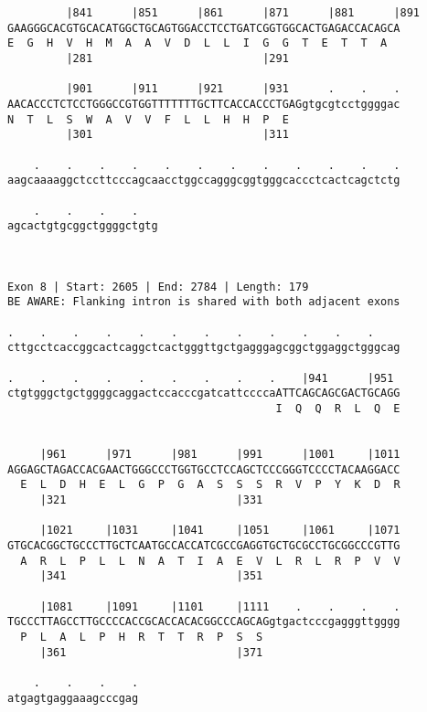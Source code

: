 \documentclass{article}
\begin{document}
\begin{Verbatim}
         |841      |851      |861      |871      |881      |891
GAAGGGCACGTGCACATGGCTGCAGTGGACCTCCTGATCGGTGGCACTGAGACCACAGCA
E  G  H  V  H  M  A  A  V  D  L  L  I  G  G  T  E  T  T  A  
         |281                          |291                 
  
         |901      |911      |921      |931      .    .    .
AACACCCTCTCCTGGGCCGTGGTTTTTTTGCTTCACCACCCTGAGgtgcgtcctggggac
N  T  L  S  W  A  V  V  F  L  L  H  H  P  E                 
         |301                          |311                 
  
    .    .    .    .    .    .    .    .    .    .    .    .
aagcaaaaggctccttcccagcaacctggccagggcggtgggcaccctcactcagctctg
                                                            
    .    .    .    .   
agcactgtgcggctggggctgtg
                       
                       
 
Exon 8 | Start: 2605 | End: 2784 | Length: 179
BE AWARE: Flanking intron is shared with both adjacent exons
 
.    .    .    .    .    .    .    .    .    .    .    .    
cttgcctcaccggcactcaggctcactgggttgctgagggagcggctggaggctgggcag
                                                            
.    .    .    .    .    .    .    .    .    |941      |951 
ctgtgggctgctggggcaggactccacccgatcattccccaATTCAGCAGCGACTGCAGG
                                         I  Q  Q  R  L  Q  E
                                                            
  
     |961      |971      |981      |991      |1001     |1011
AGGAGCTAGACCACGAACTGGGCCCTGGTGCCTCCAGCTCCCGGGTCCCCTACAAGGACC
  E  L  D  H  E  L  G  P  G  A  S  S  S  R  V  P  Y  K  D  R
     |321                          |331                     
  
     |1021     |1031     |1041     |1051     |1061     |1071
GTGCACGGCTGCCCTTGCTCAATGCCACCATCGCCGAGGTGCTGCGCCTGCGGCCCGTTG
  A  R  L  P  L  L  N  A  T  I  A  E  V  L  R  L  R  P  V  V
     |341                          |351                     
  
     |1081     |1091     |1101     |1111    .    .    .    .
TGCCCTTAGCCTTGCCCCACCGCACCACACGGCCCAGCAGgtgactcccgagggttgggg
  P  L  A  L  P  H  R  T  T  R  P  S  S                     
     |361                          |371                     
  
    .    .    .    .
atgagtgaggaaagcccgag
                    

\end{Verbatim}
\end{document}

